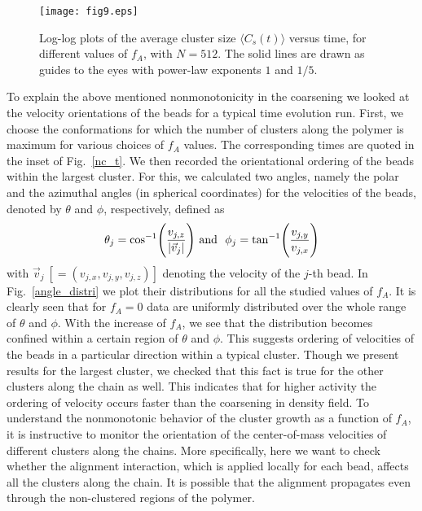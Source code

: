 \documentclass[aps,prx,reprint,showpacs,showkeys,noeprint,longbibliography]{revtex4-1} %
\begin{document}
\begin{figure}[t!]
	\centering
	\texttt{[image: fig9.eps]}
	\caption{\label{clsize_t} Log-log plots of the average cluster size  $\langle C_s(t) \rangle$  
		versus time, for different values of $f_A$, with $N=512$. 
		The solid lines are drawn as guides to the eyes with power-law exponents $1$ and $1/5$.}
\end{figure}
\par
To explain the above mentioned nonmonotonicity in the coarsening we looked at the velocity orientations of the beads for a typical time evolution run. First, we choose the conformations for which 
the number of clusters along the polymer is maximum for various choices of $f_A$ values. 
The corresponding times are quoted in the inset of Fig.~\ref{nc_t}. We  then recorded the orientational ordering of the beads within the largest cluster. For this, we calculated two angles, namely the polar and the azimuthal angles (in spherical coordinates) for the velocities of the beads, denoted by 
$\theta$ and $\phi$, respectively, defined as
\begin{eqnarray}\label{angles}
\theta_j ={\rm{cos}}^{-1} \Bigg(\frac{v_{j,z}}{|\vec{v}_j|}\Bigg) ~{\rm{and} }
~~\phi_j ={\rm{tan}}^{-1} \Bigg(\frac{v_{j,y}}{v_{j,x}}\Bigg)
\end{eqnarray}
with  $\vec{v}_j~ [=(v_{j,x},v_{j,y},v_{j,z})]$ denoting the velocity of the $j$-th bead.
In Fig.~\ref{angle_distri} we plot their distributions for all the studied values of $f_A$. 
It is clearly seen that for $f_A=0$ data are uniformly distributed
over the whole range of $\theta$ and $\phi$.  With the increase of $f_A$,
we see that the distribution becomes confined within a certain region of $\theta$ and $\phi$. This suggests
ordering of velocities of the beads in a particular direction within a typical cluster. Though we present results for the largest cluster, we checked that this fact is true for the other clusters along the chain as well. This indicates that for higher activity the ordering of velocity occurs faster than the coarsening in density field. To understand the nonmonotonic behavior of the cluster growth as a function of $f_A$,
it is instructive to monitor the orientation of the  center-of-mass velocities of different clusters along the chains. More specifically, here we want to check whether the alignment interaction, which is applied locally for each bead, affects all the clusters along 
the chain. It is possible that the alignment propagates even through the non-clustered regions of the polymer.
\end{document}
